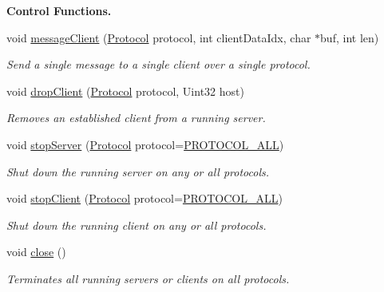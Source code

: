 \begin{Indent}{\bf Control Functions.}
\begin{DoxyCompactItemize}
void \hyperlink{classNetManager_a165db41d5fa0692307f11cba589796d0}{message\-Client} (\hyperlink{NetManager_8h_a9af285d1232beed01f31aac5d3a5469f}{Protocol} protocol, int client\-Data\-Idx, char $\ast$buf, int len)
\begin{DoxyCompactList}\small\item\em Send a single message to a single client over a single protocol. \end{DoxyCompactList}\item 
void \hyperlink{classNetManager_aaff19e422dc790a6ac4bad9aefc5749f}{drop\-Client} (\hyperlink{NetManager_8h_a9af285d1232beed01f31aac5d3a5469f}{Protocol} protocol, Uint32 host)
\begin{DoxyCompactList}\small\item\em Removes an established client from a running server. \end{DoxyCompactList}\item 
void \hyperlink{classNetManager_ac4d5cdb235713bea820ab5275a0da920}{stop\-Server} (\hyperlink{NetManager_8h_a9af285d1232beed01f31aac5d3a5469f}{Protocol} protocol=\hyperlink{NetManager_8h_a06fc87d81c62e9abb8790b6e5713c55ba78c8c360e9d58fb53829c58ac0ae6a43}{P\-R\-O\-T\-O\-C\-O\-L\-\_\-\-A\-L\-L})
\begin{DoxyCompactList}\small\item\em Shut down the running server on any or all protocols. \end{DoxyCompactList}\item 
void \hyperlink{classNetManager_a55eb599a64a651d890641a256ab4db9a}{stop\-Client} (\hyperlink{NetManager_8h_a9af285d1232beed01f31aac5d3a5469f}{Protocol} protocol=\hyperlink{NetManager_8h_a06fc87d81c62e9abb8790b6e5713c55ba78c8c360e9d58fb53829c58ac0ae6a43}{P\-R\-O\-T\-O\-C\-O\-L\-\_\-\-A\-L\-L})
\begin{DoxyCompactList}\small\item\em Shut down the running client on any or all protocols. \end{DoxyCompactList}\item 
void \hyperlink{classNetManager_afcf943b4ab1e94ba479f4e3f0cd9da2e}{close} ()
\begin{DoxyCompactList}\small\item\em Terminates all running servers or clients on all protocols. \end{DoxyCompactList}\end{DoxyCompactItemize}
\end{Indent}

